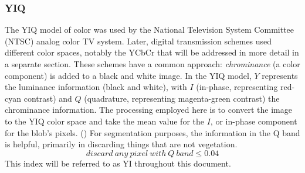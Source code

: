\documentclass[letterpaper]{report}
\begin{document}
{\subsubsection{YIQ}
The YIQ model of color was used by the  National Television System Committee (NTSC) analog color TV system. Later, digital transmission schemes used different color spaces, notably the YCbCr that will be addressed in more detail in a separate section. These schemes have a common approach: \textit{chrominance} (a color component) is added to a black and white image. In the YIQ model, $Y$ represents the luminance information (black and white), with $I$ (in-phase, representing red-cyan contrast) and $Q$ (quadrature, representing magenta-green contrast) the chrominance information. 
The processing employed here is to convert the image to the YIQ color space and take the mean value for the $I$, or in-phase component for the blob's pixels. (\cite{MathWorks_undated-jg}) For segmentation purposes, the information in the Q band is helpful, primarily in discarding things that are not vegetation.
\begin{equation}
	\label{equation:yiq}
	discard\ any\ pixel\ with\ Q\ band\leq 0.04
\end{equation}
This index will be referred to as YI throughout this document.

}
\end{document}
